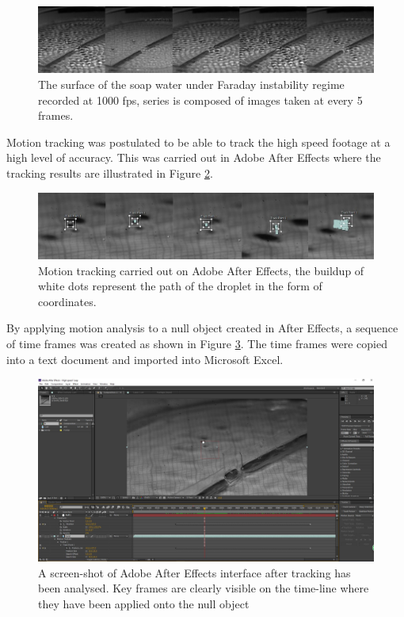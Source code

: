 \begin{figure}[htb]
\includegraphics[width=\textwidth]{prototype/exp_rep_imgs/highspeed_faraday.jpg}
\centering
\caption{The surface of the soap water under Faraday instability regime recorded at 1000 fps, series is composed of images taken at every 5 frames.}
\centering
\label{fig:highspeed_faraday}
\end{figure}

Motion tracking was postulated to be able to track the high speed footage at a high level of accuracy. This was carried out in Adobe After Effects where the tracking results are illustrated in Figure \ref{fig:tracking_droplet}.

\begin{figure}[htb]
\includegraphics[width=\textwidth]{prototype/exp_rep_imgs/tracking_droplet.jpg}
\centering
\caption{Motion tracking carried out on Adobe After Effects, the buildup of white dots represent the path of the droplet in the form of coordinates.}
\centering
\label{fig:tracking_droplet}
\end{figure}

By applying motion analysis to a null object created in After Effects,  a sequence of time frames was created as shown in Figure \ref{fig:after_effects_interface}. The time frames were copied into a text document and imported into Microsoft Excel.

\begin{figure}[htb]
\includegraphics[width=\textwidth]{prototype/exp_rep_imgs/after_effects_interface}
\centering
\caption{A screen-shot of Adobe After Effects interface after tracking has been analysed. Key frames are clearly visible on the time-line where they have been applied onto the null object}
\centering
\label{fig:after_effects_interface}
\end{figure}

